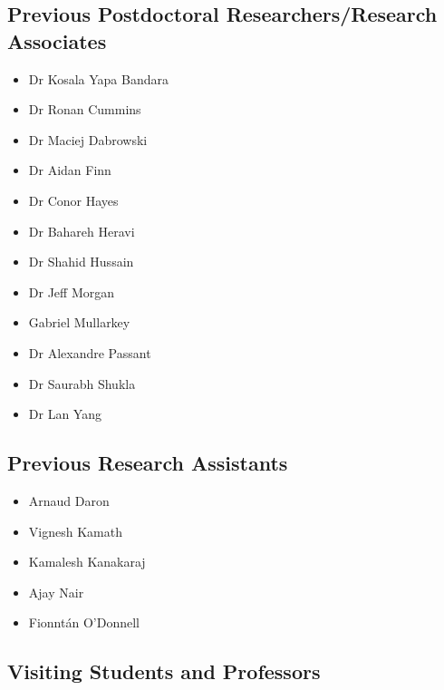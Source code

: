 \documentclass[10pt,a4paper]{res} %
\begin{document}
\begin{resume}
\subsection*{Previous Postdoctoral Researchers/Research Associates}

\begin{itemize} \itemsep -2pt
\item Dr Kosala Yapa Bandara
\item Dr Ronan Cummins
\item Dr Maciej Dabrowski
\item Dr Aidan Finn
\item Dr Conor Hayes
\item Dr Bahareh Heravi
\item Dr Shahid Hussain
\item Dr Jeff Morgan
\item Gabriel Mullarkey
\item Dr Alexandre Passant
\item Dr Saurabh Shukla
\item Dr Lan Yang
\end{itemize}

\subsection*{Previous Research Assistants}

\begin{itemize} \itemsep -2pt
\item Arnaud Daron
\item Vignesh Kamath
\item Kamalesh Kanakaraj
\item Ajay Nair
\item Fionnt\'{a}n O'Donnell
\end{itemize}

\subsection*{Visiting Students and Professors}


\end{resume}
\end{document}
